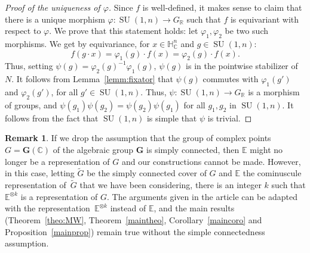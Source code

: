 \documentclass[JEP,XML,SOM,Unicode,NoFloatCountersInSection]{cedram}
\theoremstyle{plain}
\theoremstyle{definition}
\newtheorem{rema}[theo]{Remark}
\DeclareMathOperator{\SU}{SU}
\newcommand{\bC}{\mathbb{C}}
\newcommand{\bE}{\mathbb{E}}
\newcommand{\bR}{\mathbb{R}}
\newcommand{\HC}{{\mathbb{H}^n_\mathbb{C}}}
\newcommand{\bfG}{\boldsymbol{G}}
\begin{document}
\begin{proof}[Proof of the uniqueness of $\varphi$]
Since $f$ is well-defined, it makes sense to claim that there is a unique morphism $\varphi:\SU(1,n) \to G_\bR$
such that $f$ is equivariant with respect to $\varphi$. We prove that this statement holds: let
$\varphi_1,\varphi_2$ be two
such morphisms. We get by equivariance, for $x \in \HC$ and $g \in \SU(1,n)$:
$$
f(g \cdot x) = \varphi_1(g) \cdot f(x) = \varphi_2(g) \cdot f(x).
$$
Thus, setting $\psi(g)=\varphi_2(g)^{-1}\varphi_1(g)$, $\psi(g)$ is in the pointwise stabilizer of $N$. It
follows from Lemma~\ref{lemm:fixator} that $\psi(g)$ commutes with $\varphi_1(g')$
and $\varphi_2(g')$, for all $g'\in\SU(1,n)$. Thus, $\psi:\SU(1,n) \to G_\bR$ is a morphism of groups, and
$\psi(g_1)\psi(g_2)=\psi(g_2)\psi(g_1)$ for all $g_1,g_2$ in $\SU(1,n)$. It follows from the fact
that $\SU(1,n)$ is simple that $\psi$ is trivial.
\end{proof}

\begin{rema}
\label{rema:1-connected}
If we drop the assumption that the group of complex points \hbox{$G=\bfG(\bC)$} of the algebraic
group $\bfG$ is simply connected, then $\bE$ might no longer be a
representation of $G$ and our constructions cannot be made. However, in this case, letting $\tilde
G$ be the simply connected cover of $G$ and $\bE$ the cominuscule representation
of~$\tilde G$ that we have been considering, there is an integer $k$ such that $\bE^{\otimes k}$ is
a representation of $G$. The arguments given in the article can be adapted with the representation~$\bE^{\otimes k}$ instead of $\bE$, and the main results (Theorem~\ref{theo:MW}, Theorem~\ref{maintheo},
Corollary~\ref{maincoro} and Proposition~\ref{mainprop})
remain true without the simple connectedness assumption.
\end{rema}
\end{document}
